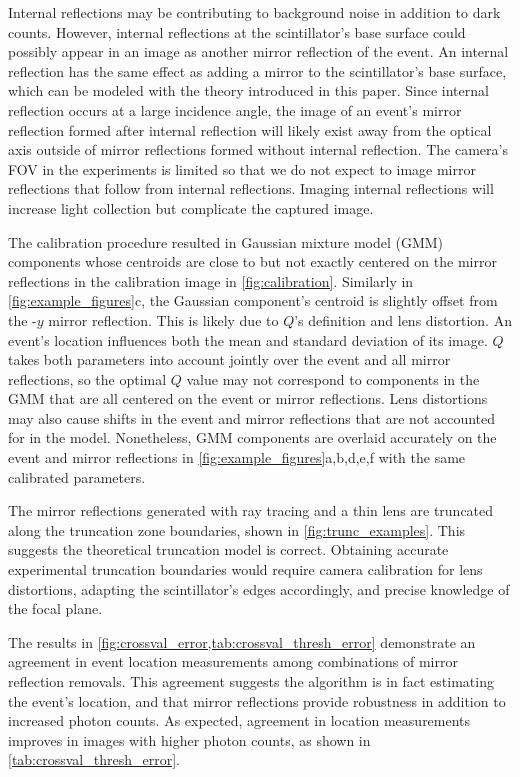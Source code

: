 Internal reflections may be contributing to background noise in addition to dark counts.
However, internal reflections at the scintillator's base surface could possibly 
appear in an image as another mirror reflection of the event.
An internal reflection has the same effect as adding a mirror to the 
scintillator's base surface, which can be modeled with the theory introduced in 
this paper.
Since internal reflection occurs at a large incidence angle, the image of an 
event's mirror reflection formed after internal reflection will likely exist away 
from the optical axis outside of mirror reflections formed without internal reflection. 
The camera's FOV in the experiments is limited so that we do not 
expect to image mirror reflections that follow from internal reflections.
Imaging internal reflections will increase light collection but complicate the 
captured image.

The calibration procedure resulted in Gaussian mixture model (GMM) components 
whose centroids are close to but not exactly centered on the mirror reflections in 
the calibration image in \cref{fig:calibration}.
Similarly in \cref{fig:example_figures}c, the Gaussian component's centroid is 
slightly offset from the -$y$ mirror reflection.
This is likely due to $Q$'s definition and lens distortion.
An event's location influences both the mean and standard deviation of its image.
$Q$ takes both parameters into account jointly over the event and all mirror 
reflections, so the optimal $Q$ value may not correspond to components in the GMM 
that are all centered on the event or mirror reflections.
Lens distortions may also cause shifts in the event and mirror reflections that 
are not accounted for in the model.
Nonetheless, GMM components are overlaid accurately on the event and mirror 
reflections in \cref{fig:example_figures}a,b,d,e,f with the same calibrated parameters.

The mirror reflections generated with ray tracing and a thin lens are truncated 
along the truncation zone boundaries, shown in \cref{fig:trunc_examples}. 
This suggests the theoretical truncation model is correct.
Obtaining accurate experimental truncation boundaries would require camera 
calibration for lens distortions, adapting the scintillator's edges accordingly, 
and precise knowledge of the focal plane.

The results in \cref{fig:crossval_error,tab:crossval_thresh_error} demonstrate an 
agreement in event location measurements among combinations of mirror reflection removals. 
This agreement suggests the algorithm is in fact estimating the event's location, 
and that mirror reflections provide robustness in addition to increased photon counts.
As expected, agreement in location measurements improves in images with higher 
photon counts, as shown in \cref{tab:crossval_thresh_error}.

